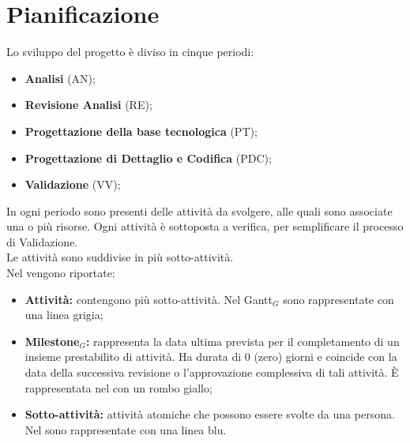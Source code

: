 \chapter{Pianificazione}
Lo sviluppo del progetto è diviso in cinque periodi:
\begin{itemize}
    \item \textbf{Analisi} (AN);
    \item \textbf{Revisione Analisi} (RE);
    \item \textbf{Progettazione della base tecnologica} (PT);
    \item \textbf{Progettazione di Dettaglio e Codifica} (PDC);
    \item \textbf{Validazione} (VV);
\end{itemize}
In ogni periodo sono presenti delle attività da svolgere, alle quali sono associate una o più risorse. Ogni attività è sottoposta a verifica, per semplificare il processo di Validazione.\\
Le attività sono suddivise in più sotto-attività.\\
Nel  vengono riportate:
\begin{itemize}
    \item \textbf{Attività:} contengono più sotto-attività. Nel Gantt$_{G}$ sono rappresentate con una linea grigia;
    \item \textbf{Milestone$_{G}$:} rappresenta la data ultima prevista per il completamento di un insieme prestabilito di attività. Ha durata di 0 (zero) giorni e coincide con la data della successiva revisione o l'approvazione complessiva di tali attività. È rappresentata nel  con un rombo giallo;
    \item \textbf{Sotto-attività:} attività atomiche che possono essere svolte da una persona. Nel  sono rappresentate con una linea blu.  
\end{itemize}
